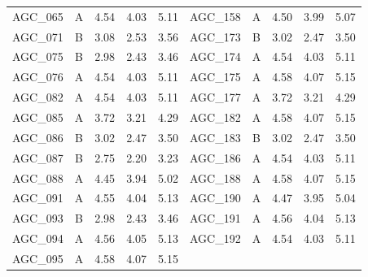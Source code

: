 \begin{table}[!t]
\begin{tabular}{@{}lcrrr@{\hspace{1.2em}}lcrrr@{}}
AGC\_065 & A & 4.54 & 4.03 & 5.11 & AGC\_158 & A & 4.50 & 3.99 & 5.07 \\
AGC\_071 & B & 3.08 & 2.53 & 3.56 & AGC\_173 & B & 3.02 & 2.47 & 3.50 \\
AGC\_075 & B & 2.98 & 2.43 & 3.46 & AGC\_174 & A & 4.54 & 4.03 & 5.11 \\
AGC\_076 & A & 4.54 & 4.03 & 5.11 & AGC\_175 & A & 4.58 & 4.07 & 5.15 \\
AGC\_082 & A & 4.54 & 4.03 & 5.11 & AGC\_177 & A & 3.72 & 3.21 & 4.29 \\
AGC\_085 & A & 3.72 & 3.21 & 4.29 & AGC\_182 & A & 4.58 & 4.07 & 5.15 \\
AGC\_086 & B & 3.02 & 2.47 & 3.50 & AGC\_183 & B & 3.02 & 2.47 & 3.50 \\
AGC\_087 & B & 2.75 & 2.20 & 3.23 & AGC\_186 & A & 4.54 & 4.03 & 5.11 \\
AGC\_088 & A & 4.45 & 3.94 & 5.02 & AGC\_188 & A & 4.58 & 4.07 & 5.15 \\
AGC\_091 & A & 4.55 & 4.04 & 5.13 & AGC\_190 & A & 4.47 & 3.95 & 5.04 \\
AGC\_093 & B & 2.98 & 2.43 & 3.46 & AGC\_191 & A & 4.56 & 4.04 & 5.13 \\
AGC\_094 & A & 4.56 & 4.05 & 5.13 & AGC\_192 & A & 4.54 & 4.03 & 5.11 \\
AGC\_095 & A & 4.58 & 4.07 & 5.15 &  & & & &  \\
\bottomrule
\end{tabular}
\end{table}
